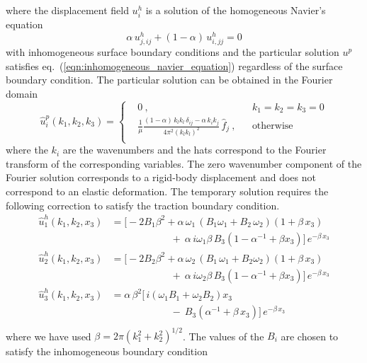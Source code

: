 \documentclass[10pt]{article}
\begin{document}
where the displacement field $u_i^h$ is a solution of the homogeneous Navier's equation
%
\begin{equation}\label{eqn:homogeneous_navier}
\alpha\,u^h_{j,ij}+(1-\alpha)\,u^h_{i,jj}=0
\end{equation}
with inhomogeneous surface boundary conditions and the particular solution $u^p$ satisfies eq.~(\ref{eqn:inhomogeneous_navier_equation}) regardless of the surface boundary condition. 
%
The particular solution can be obtained in the Fourier domain
%
\begin{equation}\label{eqn:full_space_fourier_solution}
\hat{u}^p_i(k_1,k_2,k_3)=\left\{
\begin{aligned}
&0~,  & &k_1=k_2=k_3=0\\
&\frac{1}{\mu}\frac{(1-\alpha)\,k_lk_l\,\delta_{ij}-\alpha\,k_ik_j}{4\pi^2(k_lk_l)^2}\,\hat{f}_j~, & &\text{otherwise}\\
\end{aligned}
\right.
\end{equation}
where the $k_i$ are the wavenumbers and the hats correspond to the Fourier transform of the corresponding variables. The zero wavenumber component of the Fourier solution corresponds to a rigid-body displacement and does not correspond to an elastic deformation. The temporary solution requires the following correction to satisfy the traction boundary condition. 
\begin{equation}\label{eqn:fourier_domain_solution}
\begin{aligned}
\hat{u}_1^h(k_1,k_2,x_3)&=\big[-2B_1\beta^2+\alpha\,\omega_1\,(B_1\omega_1+B_2\,\omega_2)(1+\beta\,x_3)\\
&\qquad\qquad\qquad+~\alpha\,i\omega_1\beta\,B_3(1-\alpha^{-1}+\beta x_3)\big]\,e^{-\beta\,x_3}\\
\hat{u}_2^h(k_1,k_2,x_3)&=\big[-2B_2\beta^2+\alpha\,\omega_2\,(B_1\,\omega_1+B_2\omega_2)(1+\beta\,x_3)\\
&\qquad\qquad\qquad+~\alpha\,i\omega_2\beta\,B_3(1-\alpha^{-1}+\beta x_3)\big]\,e^{-\beta\,x_3}\\
\hat{u}_3^h(k_1,k_2,x_3)&=\alpha\,\beta^2\big[\,i\left(\omega_1B_1+\omega_2B_2\right)x_3\\
&\qquad\qquad\qquad-~B_3\left(\alpha^{-1}+\beta\,x_3\right)\big]\,e^{-\beta\,x_3}\\
\end{aligned}
\end{equation}
where we have used $\beta=2\pi\left(k_1^2+k_2^2\right)^{1/2}$. The values of the $B_i$ are chosen to satisfy the inhomogeneous boundary condition
\end{document}
